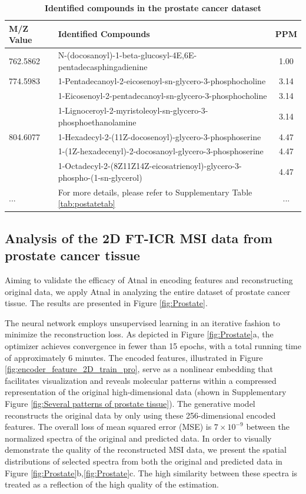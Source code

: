\documentclass{WileyMSP-template}
\begin{document}
\begin{table}[ht]
  \centering
  \caption{ \textbf{Identified compounds in the prostate cancer dataset}}
  \label{tbl:Compounds_pro}
  \begin{tabular}{|p{4cm}|p{12cm}|c|}
    \hline
    \textbf{M/Z Value} & \textbf{Identified Compounds}&\textbf{PPM} \\
    \hline
    762.5862 
    & N-(docosanoyl)-1-beta-glucosyl-4E,6E-pentadecasphingadienine &1.00\\
    \hline
    774.5983 
    & 1-Pentadecanoyl-2-eicosenoyl-sn-glycero-3-phosphocholine &3.14\\
    & 1-Eicosenoyl-2-pentadecanoyl-sn-glycero-3-phosphocholine &3.14\\
    & 1-Lignoceroyl-2-myristoleoyl-sn-glycero-3-phosphoethanolamine &3.14\\
    \hline
    804.6077
    & 1-Hexadecyl-2-(11Z-docosenoyl)-glycero-3-phosphoserine &4.47  \\
    & 1-(1Z-hexadecenyl)-2-docosanoyl-glycero-3-phosphoserine & 4.47    \\
    & 1-Octadecyl-2-(8Z11Z14Z-eicosatrienoyl)-glycero-3-phospho-(1-sn-glycerol) &4.47\\
    \hline
    ...& For more details, please refer to Supplementary Table \ref{tab:postatetab} &...\\
    \hline 
  \end{tabular} 
\end{table}
 
 
\subsection{Analysis of the 2D FT-ICR MSI data 
from prostate cancer tissue}

Aiming to validate the efficacy of Atnal in encoding features and reconstructing 
original data, we apply Atnal in analyzing the entire dataset of prostate cancer tissue. 
The results are presented in Figure \ref{fig:Prostate}. 

The neural network employs unsupervised learning in an iterative fashion to 
minimize the reconstruction loss. As depicted in  Figure \ref{fig:Prostate}a,
the optimizer achieves convergence in fewer than 
15 epochs, with a total running time of approximately 6 minutes. 
The encoded features, illustrated in  Figure \ref{fig:encoder_feature_2D_train_pro}, 
serve as a nonlinear embedding that facilitates visualization and reveals 
molecular patterns within a compressed  
representation of the original high-dimensional data 
(shown in Supplementary Figure \ref{fig:Several patterns of prostate tissue}).
The generative model reconstructs the original data by only using 
these 256-dimensional encoded features. The overall loss 
of mean squared error (MSE) is $7  \times 10^{-9}$ between 
the normalized spectra of the 
original and predicted data. In order to visually 
demonstrate the quality of the reconstructed MSI data, we present the spatial
distributions of selected spectra from both the original and 
predicted data in Figure \ref{fig:Prostate}b,\ref{fig:Prostate}c. 
The high similarity between these spectra is treated  as a 
reflection of the high quality of the estimation. 
 
\end{document}
